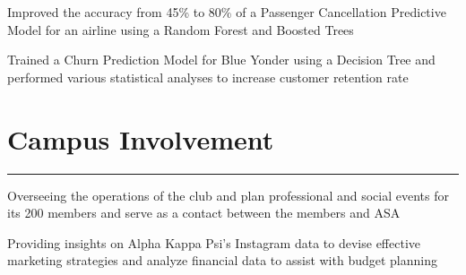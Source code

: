 \documentclass[]{sahana}
\begin{document}
\begin{minipage}[t]{0.66\textwidth}
\vspace{-4pt}
\noindent
\begin{tightemize}
\vspace{-6pt}
\item Improved the accuracy from 45\% to 80\% of a Passenger Cancellation Predictive Model for an airline using a Random Forest and Boosted Trees 
\item Trained a Churn Prediction Model for Blue Yonder using a Decision Tree and performed various statistical analyses to increase customer retention rate
\end{tightemize}
\sectionsep

\section{Campus Involvement}
\noindent\rule{12.5cm}{0.4pt}

\vspace{-6pt}
\begin{tightemize}
\item Overseeing the operations of the club and plan professional and social events for its 200 members and serve as a contact between the members and ASA
\end{tightemize}
\vspace{1pt}

\vspace{-5pt}
\begin{tightemize}
\item Providing insights on Alpha Kappa Psi's Instagram data to devise effective marketing strategies and analyze financial data to assist with budget planning 
\end{tightemize}
\vspace{1pt}


\end{minipage}
\end{document}

